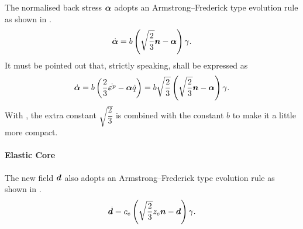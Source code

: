     The normalised back stress $\bm{\alpha}$ adopts an Armstrong--Frederick type \citep{Frederick2007} evolution rule as shown in .
    \begin{gather}
        \dot{\bm{\alpha}}=b\left(\sqrt{\dfrac{2}{3}}\bm{n}-\bm{\alpha}\right)\gamma.
    \end{gather}
    It must be pointed out that, strictly speaking,  shall be expressed as
    \begin{gather}
        \dot{\bm{\alpha}}=b\left(\dfrac{2}{3}\dot{\bm{\varepsilon}^p}-\bm{\alpha}\dot{q}\right)=b\sqrt{\dfrac{2}{3}}\left(\sqrt{\dfrac{2}{3}}\bm{n}-\bm{\alpha}\right)\gamma.
    \end{gather}
    With , the extra constant $\sqrt{\dfrac{2}{3}}$ is combined with the constant $b$ to make it a little more compact.
    \paragraph{Elastic Core}
    The new field $\bm{d}$ also adopts an Armstrong--Frederick type evolution rule as shown in .
    \begin{gather}
    \dot{\bm{d}}=c_e\left(\sqrt{\dfrac{2}{3}}z_e\bm{n}-\bm{d}\right)\gamma.
\end{gather}
